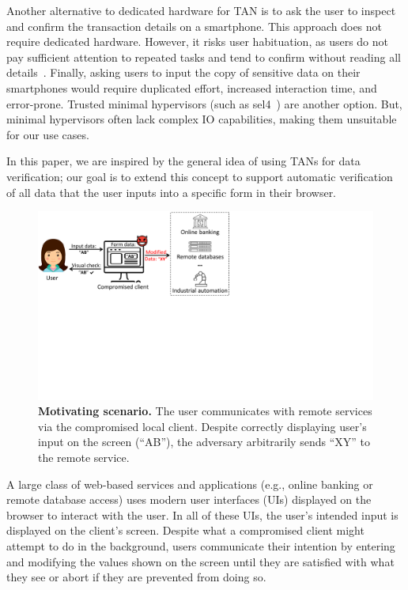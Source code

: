 \documentclass[sigconf, anonymous, balance=false]{acmart}
\newcommand{\myparagraph}[1]{\myparagraphnodot{#1.}}
\newcommand{\myparagraphnodot}[1]{\vspace{4pt} \noindent {\bfseries #1}\xspace}
\begin{document}
Another alternative to dedicated hardware for TAN is to ask the user to inspect and confirm the transaction details on a smartphone.
This approach does not require dedicated hardware. However, it risks user habituation, as users do not pay sufficient attention to repeated tasks and tend to confirm without reading all details~\cite{userHabituation08}. Finally, asking users to input the copy of sensitive data on their smartphones would require duplicated effort, increased interaction time, and error-prone. Trusted minimal hypervisors (such as sel4~\cite{klein2009sel4}) are another option. But, minimal hypervisors often lack complex IO capabilities, making them unsuitable for our use cases.


In this paper, we are inspired by the general idea of using TANs for data verification; our goal is to extend this concept to support automatic verification of all data that the user inputs into a specific form in their browser.



\begin{figure}[t]
 \centering
 \includegraphics[trim={0 10.4cm 14.4cm 0},clip,width=\linewidth]{img/motivatingScenario.pdf}
\caption{\textbf{Motivating scenario.}
 	The user communicates with remote services via the compromised local client.
 	Despite correctly displaying user's input on the screen (``AB''), the adversary arbitrarily sends ``XY'' to the remote service.}
 \label{fig:scenario}
\end{figure}



\myparagraph{Visually extracting user intent}
A large class of web-based services and applications (e.g., online banking or remote database access) uses modern user interfaces (UIs) displayed on the browser to interact with the user. In all of these UIs, the user's intended input is displayed on the client's screen.
Despite what a compromised client might attempt to do in the background, users communicate their intention by entering and modifying the values shown on the screen until they are satisfied with what they see or abort if they are prevented from doing so.
\end{document}
